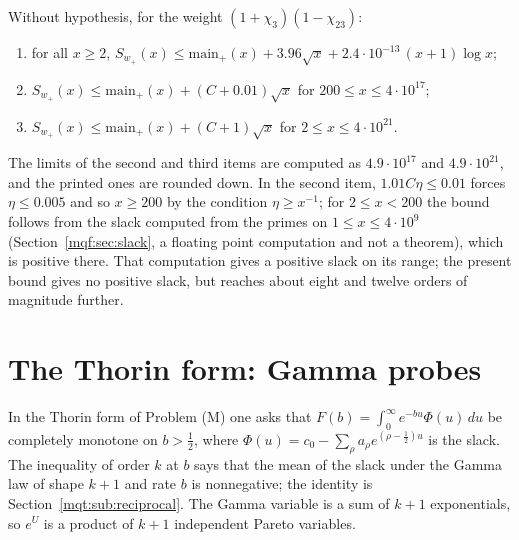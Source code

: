 \begin{corollary}\label{gbm:cor:family}
Without hypothesis, for the weight $(1+\chi_3)(1-\chi_{23})$:
\begin{enumerate}
\item for all $x\ge2$, $S_{w_+}(x)\le\mathrm{main}_+(x)+3.96\sqrt x+2.4\cdot10^{-13}\,(x+1)\log x$;
\item $S_{w_+}(x)\le\mathrm{main}_+(x)+(C+0.01)\sqrt x$ for $200\le x\le4\cdot10^{17}$;
\item $S_{w_+}(x)\le\mathrm{main}_+(x)+(C+1)\sqrt x$ for $2\le x\le4\cdot10^{21}$.
\end{enumerate}
\end{corollary}

The limits of the second and third items are computed as $4.9\cdot10^{17}$ and $4.9\cdot10^{21}$, and the printed ones are rounded down. In the second item, $1.01C\eta\le0.01$ forces $\eta\le0.005$ and so $x\ge200$ by the condition $\eta\ge x^{-1}$; for $2\le x<200$ the bound follows from the slack computed from the primes on $1\le x\le4\cdot10^9$ (Section~\ref{mqf:sec:slack}, a floating point computation and not a theorem), which is positive there. That computation gives a positive slack on its range; the present bound gives no positive slack, but reaches about eight and twelve orders of magnitude further.

\section{The Thorin form: Gamma probes}\label{gbm:sec:gamma}

In the Thorin form of Problem (M) one asks that $F(b)=\int_0^\infty e^{-bu}\Phi(u)\,du$ be completely monotone on $b>\frac12$, where $\Phi(u)=c_0-\sum_\rho a_\rho e^{(\rho-\frac12)u}$ is the slack. The inequality of order $k$ at $b$ says that the mean of the slack under the Gamma law of shape $k+1$ and rate $b$ is nonnegative; the identity is Section~\ref{mqt:sub:reciprocal}. The Gamma variable is a sum of $k+1$ exponentials, so $e^U$ is a product of $k+1$ independent Pareto variables.

